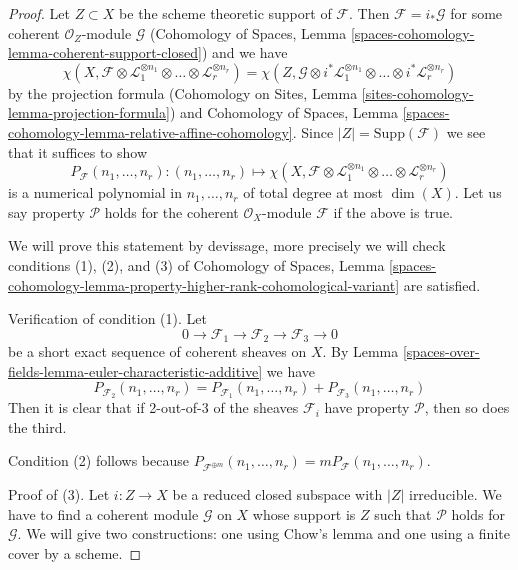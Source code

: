 \begin{proof}
Let $Z \subset X$ be the scheme theoretic support of $\mathcal{F}$.
Then $\mathcal{F} = i_*\mathcal{G}$ for some coherent
$\mathcal{O}_Z$-module $\mathcal{G}$
(Cohomology of Spaces, Lemma
\ref{spaces-cohomology-lemma-coherent-support-closed})
and we have
$$
\chi(X, \mathcal{F} \otimes
\mathcal{L}_1^{\otimes n_1} \otimes \ldots \otimes
\mathcal{L}_r^{\otimes n_r}) =
\chi(Z, \mathcal{G} \otimes
i^*\mathcal{L}_1^{\otimes n_1} \otimes \ldots \otimes
i^*\mathcal{L}_r^{\otimes n_r})
$$
by the projection formula
(Cohomology on Sites, Lemma \ref{sites-cohomology-lemma-projection-formula})
and Cohomology of Spaces, Lemma
\ref{spaces-cohomology-lemma-relative-affine-cohomology}.
Since $|Z| = \text{Supp}(\mathcal{F})$ we see that it suffices
to show
$$
P_\mathcal{F}(n_1, \ldots, n_r) :
(n_1, \ldots, n_r)
\longmapsto
\chi(X, \mathcal{F} \otimes
\mathcal{L}_1^{\otimes n_1} \otimes \ldots \otimes
\mathcal{L}_r^{\otimes n_r})
$$
is a numerical polynomial in $n_1, \ldots, n_r$ of total degree at
most $\dim(X)$. Let us say property $\mathcal{P}$ holds for the
coherent $\mathcal{O}_X$-module $\mathcal{F}$ if the above is true.

\medskip\noindent
We will prove this statement by devissage, more precisely we will
check conditions (1), (2), and (3) of
Cohomology of Spaces, Lemma
\ref{spaces-cohomology-lemma-property-higher-rank-cohomological-variant}
are satisfied.

\medskip\noindent
Verification of condition (1). Let
$$
0 \to \mathcal{F}_1 \to \mathcal{F}_2 \to \mathcal{F}_3 \to 0
$$
be a short exact sequence of coherent sheaves on $X$.
By Lemma \ref{spaces-over-fields-lemma-euler-characteristic-additive} we have
$$
P_{\mathcal{F}_2}(n_1, \ldots, n_r) =
P_{\mathcal{F}_1}(n_1, \ldots, n_r) +
P_{\mathcal{F}_3}(n_1, \ldots, n_r)
$$
Then it is clear that if 2-out-of-3 of the sheaves $\mathcal{F}_i$
have property $\mathcal{P}$, then so does the third.

\medskip\noindent
Condition (2) follows because
$P_{\mathcal{F}^{\oplus m}}(n_1, \ldots, n_r) =
mP_\mathcal{F}(n_1, \ldots, n_r)$.

\medskip\noindent
Proof of (3). Let $i : Z \to X$ be a reduced closed subspace with
$|Z|$ irreducible. We have to find a coherent module $\mathcal{G}$
on $X$ whose support is $Z$ such that $\mathcal{P}$ holds for $\mathcal{G}$.
We will give two constructions: one using Chow's lemma and one
using a finite cover by a scheme.


\end{proof}
